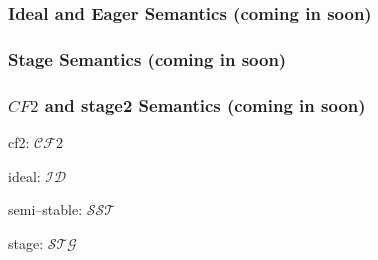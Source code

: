 



\subsubsection{Ideal and Eager Semantics (coming in soon)}

\subsubsection{Stage Semantics (coming in soon)}

\subsubsection{$CF2$ and stage2 Semantics (coming in soon)}


cf2: $\mathcal{CF}2$

ideal: $\mathcal{ID}$

semi--stable: $\mathcal{SST}$ 

stage: $\mathcal{STG}$

